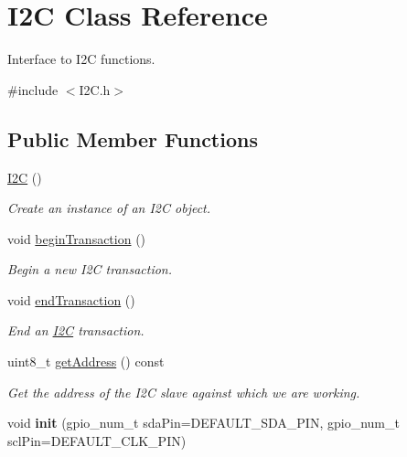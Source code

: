 \hypertarget{class_i2_c}{}\section{I2C Class Reference}
\label{class_i2_c}


Interface to I2C functions.  




{\ttfamily \#include $<$I2\+C.\+h$>$}

\subsection*{Public Member Functions}
\begin{DoxyCompactItemize}
\item 
\hyperlink{class_i2_c_a7a9a84fccdacb3346ff97d6f3e158850}{I2C} ()
\begin{DoxyCompactList}\small\item\em Create an instance of an I2C object. \end{DoxyCompactList}\item 
void \hyperlink{class_i2_c_a414fa12d9ddd715be6802cd6fbe8d0ed}{begin\+Transaction} ()
\begin{DoxyCompactList}\small\item\em Begin a new I2C transaction. \end{DoxyCompactList}\item 
void \hyperlink{class_i2_c_ad43e562aaf70eac7acca8fde9f904234}{end\+Transaction} ()
\begin{DoxyCompactList}\small\item\em End an \hyperlink{class_i2_c}{I2C} transaction. \end{DoxyCompactList}\item 
uint8\+\_\+t \hyperlink{class_i2_c_a593bd4823b8533e05aa286f7479fe038}{get\+Address} () const 
\begin{DoxyCompactList}\small\item\em Get the address of the I2C slave against which we are working. \end{DoxyCompactList}\item 
void {\bfseries init} (gpio\+\_\+num\+\_\+t sda\+Pin=D\+E\+F\+A\+U\+L\+T\+\_\+\+S\+D\+A\+\_\+\+P\+IN, gpio\+\_\+num\+\_\+t scl\+Pin=D\+E\+F\+A\+U\+L\+T\+\_\+\+C\+L\+K\+\_\+\+P\+IN)\hypertarget{class_i2_c_a6130d92fc5baeca4f4a9bf2c874996c0}{}\label{class_i2_c_a6130d92fc5baeca4f4a9bf2c874996c0}


\end{DoxyCompactItemize}
